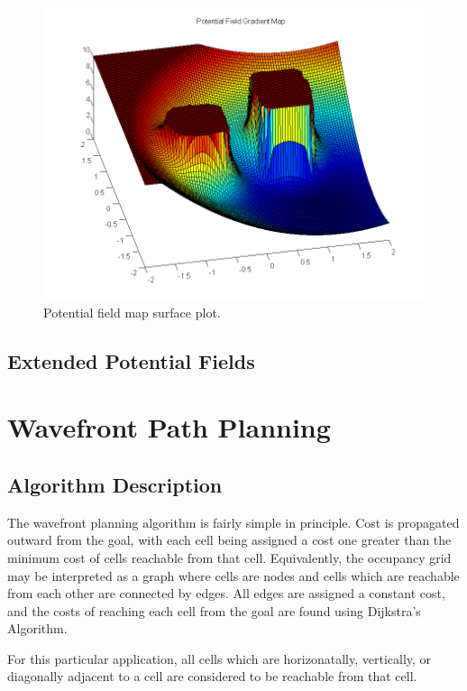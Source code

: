 \documentclass[11pt]{article} %
\begin{document}
\begin{figure}[hbt]
 \centering
 \includegraphics[scale=0.60]{Potential_Field_Surf_Plot.png}
 \caption{Potential field map surface plot.}
 \label{potField_Surf}
\end{figure}


\subsection{Extended Potential Fields}
\section{Wavefront Path Planning}

\subsection{Algorithm Description}
The wavefront planning algorithm is fairly simple in principle.  Cost is propagated outward from the goal, with each cell being assigned a cost one greater than the minimum cost of cells reachable from that cell.  Equivalently, the occupancy grid may be interpreted as a graph where cells are nodes and cells which are reachable from each other are connected by edges.  All edges are assigned a constant cost, and the costs of reaching each cell from the goal are found using Dijkstra's Algorithm.

For this particular application, all cells which are horizonatally, vertically, or diagonally adjacent to a cell are considered to be reachable from that cell.
\end{document}

